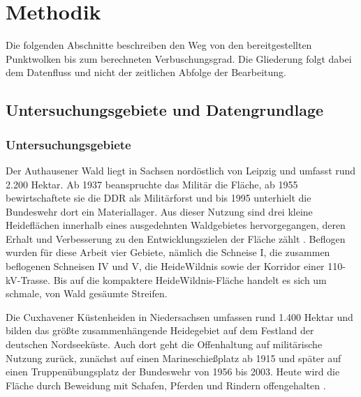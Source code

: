 \newpage
\section{Methodik}\label{methodik}



Die folgenden Abschnitte beschreiben den Weg von den bereitgestellten Punktwolken bis zum berechneten Verbuschungsgrad. Die Gliederung folgt dabei dem Datenfluss und nicht der zeitlichen Abfolge der Bearbeitung.

\subsection{Untersuchungsgebiete und Datengrundlage}\label{gebiete_daten}

\subsubsection{Untersuchungsgebiete}\label{untersuchungsgebiet}

Der Authausener Wald liegt in Sachsen nordöstlich von Leipzig und umfasst rund 2.200 Hektar. Ab 1937 beanspruchte das Militär die Fläche, ab 1955 bewirtschaftete sie die DDR als Militärforst und bis 1995 unterhielt die Bundeswehr dort ein Materiallager. Aus dieser Nutzung sind drei kleine Heideflächen innerhalb eines ausgedehnten Waldgebietes hervorgegangen, deren Erhalt und Verbesserung zu den Entwicklungszielen der Fläche zählt \cite{DBU.Authausen}. Beflogen wurden für diese Arbeit vier Gebiete, nämlich die Schneise I, die zusammen beflogenen Schneisen IV und V, die HeideWildnis sowie der Korridor einer 110-kV-Trasse. Bis auf die kompaktere HeideWildnis-Fläche handelt es sich um schmale, von Wald gesäumte Streifen.

Die Cuxhavener Küstenheiden in Niedersachsen umfassen rund 1.400 Hektar und bilden das größte zusammenhängende Heidegebiet auf dem Festland der deutschen Nordseeküste. Auch dort geht die Offenhaltung auf militärische Nutzung zurück, zunächst auf einen Marineschießplatz ab 1915 und später auf einen Truppenübungsplatz der Bundeswehr von 1956 bis 2003. Heute wird die Fläche durch Beweidung mit Schafen, Pferden und Rindern offengehalten \cite{DBU.Cuxhaven}.

